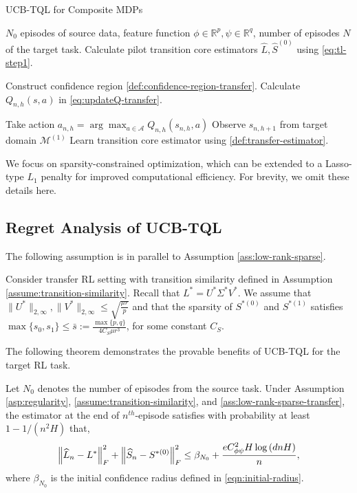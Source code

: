 \begin{algorithm}[tb]
\caption{UCB-TQL for Composite MDPs}\label{algo:UCBTQL}
\begin{algorithmic}
 $N_0$ episodes of source data, feature function $\phi\in \mathbb{R}^p, \psi\in \mathbb{R}^q$, number of episodes $N$ of the target task.
\STATE Calculate pilot transition core estimators $\hat L,\hat S^{(0)}$ using \eqref{eq:tl-step1}.

\STATE Construct confidence region \eqref{def:confidence-region-transfer}. \STATE Calculate $Q_{n, h}(s, a)$ in \eqref{eq:updateQ-transfer}. 

\STATE Take action $a_{n, h}=\arg \max _{a \in \mathcal{A}} Q_{n, h}\left(s_{n, h}, a\right)$\;
\STATE Observe $s_{n, h+1}$ from target domain $\mathcal{M}^{(1)}$\;
\ENDFOR
\STATE Learn transition core estimator using \eqref{def:transfer-estimator}. 
\ENDFOR
\end{algorithmic}
\end{algorithm}

\begin{remark}
We focus on sparsity-constrained optimization, which can be extended to a Lasso-type $L_1$ penalty for improved computational efficiency. For brevity, we omit these details here.
\end{remark}

\subsection{Regret Analysis of UCB-TQL}
The following assumption is in parallel to Assumption \ref{ass:low-rank-sparse}. 
\begin{assumption}
Consider transfer RL setting with transition similarity defined in Assumption \ref{assume:transition-similarity}. Recall that $L^*=U^*\Sigma^* V^*$.
We assume that $\|U^*\|_{2,\infty},\|V^*\|_{2,\infty}\le \sqrt{\frac{\mu r}{p}}$ and that the sparsity of $ S^{*(0)}$ and $ S^{*(1)}$ satisfies $\max\{s_0,s_1\} \leq \bar s:=\frac{\max\{p,q\}}{4C_S\mu r^3}$, for some constant $C_S$.
\label{ass:low-rank-sparse-transfer}
\end{assumption}

The following theorem demonstrates the provable benefits of UCB-TQL for the target RL task. 

\begin{lemma}
Let $N_0$ denotes the number of episodes from the source task. 
Under Assumption \ref{asp:regularity}, \ref{assume:transition-similarity}, and \ref{ass:low-rank-sparse-transfer}, 
the estimator at the end of $n^{th}$-episode satisfies with probability at least $1-1/(n^2H)$ that,
\[\left\lVert\widehat L_n-L^*\right\rVert_F^2+\left\lVert\widehat S_n-S^{*(0)}\right\rVert_F^2\leq \beta_{N_0}+\frac{e C_{\phi\psi}^2H\log\left(dnH\right)}{n},\]
where $\beta_{N_0}$ is the initial confidence radius defined in \eqref{eqn:initial-radius}.
\end{lemma}

